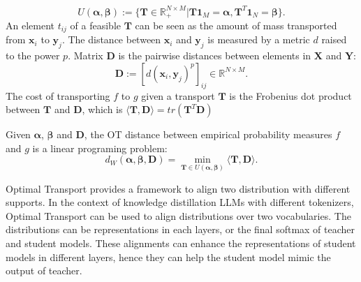 {\small\begin{equation}
    U(\boldsymbol{\alpha}, \boldsymbol{\beta}) := \{ \boldsymbol{T} \in \mathbb{R}_{+}^{N \times M} | \boldsymbol{T}\boldsymbol{1}_{M}=\boldsymbol{\alpha}, \boldsymbol{T}^T\boldsymbol{1}_{N}=\boldsymbol{\beta} \}.
\end{equation}}
An element $t_{ij}$ of a feasible $\boldsymbol{T}$ can be seen as the amount of mass transported from $\boldsymbol{x}_{i}$ to $\boldsymbol{y}_{j}$. The distance between $\boldsymbol{x}_{i}$ and $\boldsymbol{y}_{j}$ is measured by a metric $d$ raised to the power $p$. Matrix $\boldsymbol{D}$ is the pairwise distances between elements in $\boldsymbol{X}$ and $\boldsymbol{Y}$:
\begin{equation}
    \boldsymbol{D} := [d(\boldsymbol{x}_{i}, \boldsymbol{y}_{j})^p]_{ij} \in \mathbb{R}^{N \times M}.
\end{equation}
The cost of transporting $f$ to $g$ given a transport $\boldsymbol{T}$ is the Frobenius dot product between $\boldsymbol{T}$ and $\boldsymbol{D}$, which is $ \langle \boldsymbol{T},\boldsymbol{D} \rangle = tr(\boldsymbol{T}^T\boldsymbol{D})$ 

Given $\boldsymbol{\alpha}$, $\boldsymbol{\beta}$ and $\boldsymbol{D}$, the OT distance between empirical probability measures $f$ and $g$ is a linear programing problem:
\begin{equation}
    d_{W}(\boldsymbol{\alpha},\boldsymbol{\beta},\boldsymbol{D}) = \min_{\boldsymbol{T} \in U(\boldsymbol{\alpha},\boldsymbol{\beta})} \langle \boldsymbol{T},\boldsymbol{D} \rangle.
\end{equation}



Optimal Transport provides a framework to align two distribution with different supports. In the context of knowledge distillation LLMs with different tokenizers, Optimal Transport can be used to align distributions over two vocabularies. The distributions can be representations in each layers, or the final softmax of teacher and student models. These alignments can enhance the representations of student models in different layers, hence they can help the student model mimic the output of teacher.